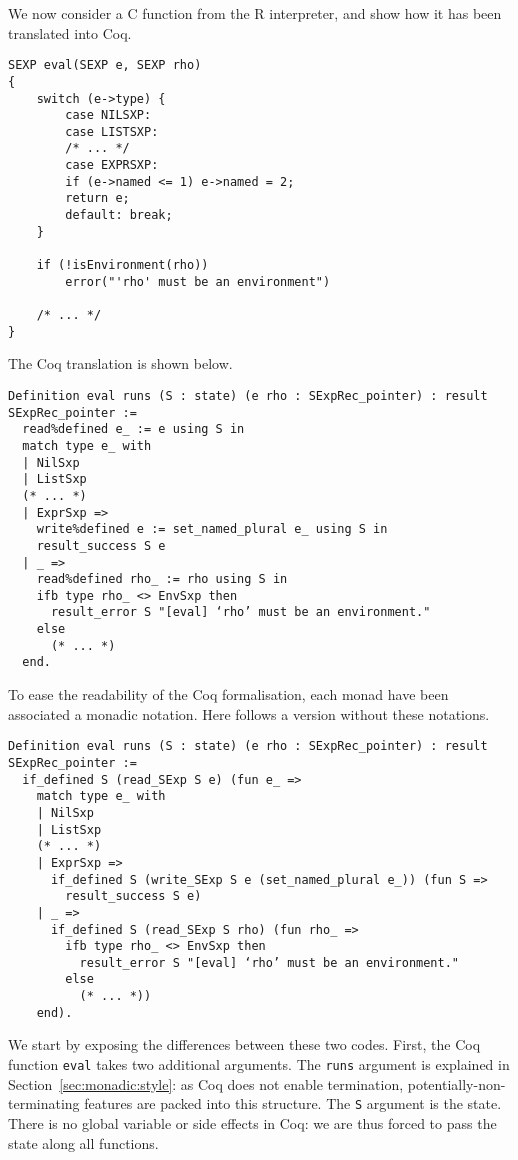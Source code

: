 \documentclass{article}
\newcommand\Coq{Coq}
\newcommand\R{R}
\newcommand\Cn{C}
\begin{document}
We now consider a \Cn{} function from the \R{} interpreter,
and show how it has been translated into \Coq{}.
\begin{verbatim}
SEXP eval(SEXP e, SEXP rho)
{
    switch (e->type) {
        case NILSXP:
        case LISTSXP:
        /* ... */
        case EXPRSXP:
        if (e->named <= 1) e->named = 2;
        return e;
        default: break;
    }

    if (!isEnvironment(rho))
        error("'rho' must be an environment")

    /* ... */
}
\end{verbatim}
The \Coq{} translation is shown below.
\begin{verbatim}
Definition eval runs (S : state) (e rho : SExpRec_pointer) : result SExpRec_pointer :=
  read%defined e_ := e using S in
  match type e_ with
  | NilSxp
  | ListSxp
  (* ... *)
  | ExprSxp =>
    write%defined e := set_named_plural e_ using S in
    result_success S e
  | _ =>
    read%defined rho_ := rho using S in
    ifb type rho_ <> EnvSxp then
      result_error S "[eval] ‘rho’ must be an environment."
    else
      (* ... *)
  end.
\end{verbatim}
To ease the readability of the \Coq{} formalisation,
each monad have been associated a monadic notation.
Here follows a version without these notations.
\begin{verbatim}
Definition eval runs (S : state) (e rho : SExpRec_pointer) : result SExpRec_pointer :=
  if_defined S (read_SExp S e) (fun e_ =>
    match type e_ with
    | NilSxp
    | ListSxp
    (* ... *)
    | ExprSxp =>
      if_defined S (write_SExp S e (set_named_plural e_)) (fun S =>
        result_success S e)
    | _ =>
      if_defined S (read_SExp S rho) (fun rho_ =>
        ifb type rho_ <> EnvSxp then
          result_error S "[eval] ‘rho’ must be an environment."
        else
          (* ... *))
    end).
\end{verbatim}
We start by exposing the differences between these two codes.
First, the \Coq{} function \texttt{eval} takes two additional arguments.
The \texttt{runs} argument is explained in Section~\ref{sec:monadic:style}:
as \Coq{} does not enable termination, potentially-non-terminating features
are packed into this structure.
The \texttt{S} argument is the state.
There is no global variable or side effects in \Coq{}:
we are thus forced to pass the state along all functions.
\end{document}
